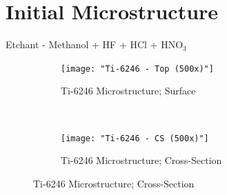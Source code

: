 \documentclass[11pt,letterpaper]{article}
\newcommand{\workingDate}{\textsc{2017 $|$ August $|$ 11}}
\begin{document}
\newpage
\renewcommand{\workingDate}{\textsc{2017 $|$ August $|$ 14}}
\section*{Initial Microstructure}
Etchant - Methanol + HF + HCl + HNO$_{3}$

\begin{figure}[H]
    \centering
    \begin{subfigure}{0.40\textwidth}
        \texttt{[image: "Ti-6246 - Top (500x)"]}
        \caption{Ti-6246 Microstructure; Surface}
        \label{fig:2a}
    \end{subfigure}
    ~
    \begin{subfigure}{0.40\textwidth}
        \texttt{[image: "Ti-6246 - CS (500x)"]}
        \caption{Ti-6246 Microstructure; Cross-Section}
        \label{fig:2b}
    \end{subfigure}
    \label{fig:As-Received}
\end{figure}
\end{document}

